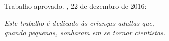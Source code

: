 \documentclass[
	12pt,				%
	openright,			%
	oneside,
	a4paper,			%
	english,			%
	french,				%
	spanish,			%
	brazil				%
	]{abntex2}
\begin{document}

%
% 
%
\begin{folhadeaprovacao}

  \begin{center}
    {\ABNTEXchapterfont\large\imprimirautor}

    \vspace*{\fill}\vspace*{\fill}
    \begin{center}
      \ABNTEXchapterfont\bfseries\Large\imprimirtitulo
    \end{center}
    \vspace*{\fill}
    
    \hspace{.45\textwidth}
    \begin{minipage}{.5\textwidth}
        \imprimirpreambulo
    \end{minipage}%
    \vspace*{\fill}
   \end{center}
        
   Trabalho aprovado. \imprimirlocal, 22 de dezembro de 2016:

      
   \begin{center}
    \vspace*{0.5cm}
    {\large\imprimirlocal}
    \par
    {\large\imprimirdata}
    \vspace*{1cm}
  \end{center}
  
\end{folhadeaprovacao}

\begin{dedicatoria}
   \vspace*{\fill}
   \centering
   \noindent
   \textit{ Este trabalho é dedicado às crianças adultas que,\\
   quando pequenas, sonharam em se tornar cientistas.} \vspace*{\fill}
\end{dedicatoria}
\end{document}
